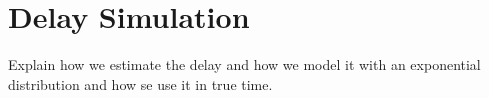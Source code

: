 \section{Delay Simulation}

Explain how we estimate the delay and how we model it with an exponential distribution and how se use it in true time.